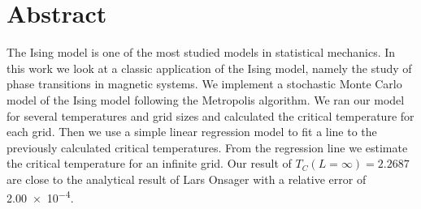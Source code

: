 \section*{Abstract}

The Ising model is one of the most studied models in statistical mechanics. In
this work we look at a classic application of the Ising model, namely
the study of phase transitions in magnetic systems.
We implement a stochastic Monte Carlo model of the Ising model following the
Metropolis algorithm. We ran our model for several temperatures and grid
sizes and calculated the critical temperature for each grid. Then we use a
simple linear regression model to fit a line to the previously calculated
critical temperatures. From the regression line we estimate the critical
temperature for an infinite grid. Our result of $T_C(L=\infty)=2.2687$ are close
to the analytical result of Lars Onsager \parencite{Lars1944} with a relative
error of \num{2.00e-4}.
